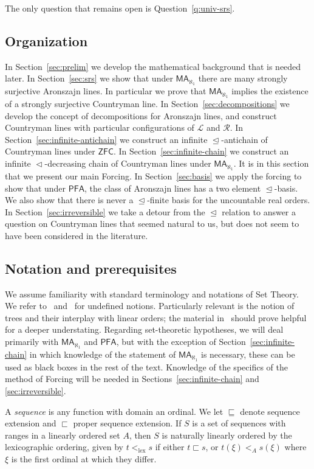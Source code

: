 \documentclass[10pt]{amsart}
\theoremstyle{definition}
\theoremstyle{remark}
\newcommand{\axiom}[1]{\mathsf{#1}}
\newcommand{\ZFC}{\axiom{ZFC}}
\newcommand{\MA}{\axiom{MA}}
\newcommand{\PFA}{\axiom{PFA}}
\newcommand{\sle}{\vartriangleleft}
\newcommand{\sleq}{\trianglelefteq}
\renewcommand{\L}{\mathscr{L}}
\newcommand{\R}{\mathscr{R}}
\newcommand\lex{\mathrm{lex}}
\newcommand{\1}{\mathbbm{1}}
\newcommand{\tleq}{\sqsubseteq}
\newcommand{\tle}{\sqsubset}
\begin{document}
The only question that remains open is Question~\ref{q:univ-srs}.

\subsection*{Organization}
In Section~\ref{sec:prelim} we develop the mathematical background that is
needed later.
In Section~\ref{sec:srs} we show that under
$\MA_{\aleph_{1}}$ there are many strongly surjective Aronszajn lines.
In particular we prove that $\MA_{\aleph_{1}}$ implies the existence
of a strongly surjective Countryman line.
In Section~\ref{sec:decompositions}
we develop the concept of decompositions for Aronszajn lines, and
construct Countryman lines with particular configurations of $\L$ and
$\R$.
In Section~\ref{sec:infinite-antichain} we construct an infinite
$\sleq$-antichain of Countryman lines under $\ZFC$.
In Section~\ref{sec:infinite-chain} we construct an infinite
$\sle$-decreasing chain of Countryman lines under $\MA_{\aleph_{1}}$. It is
in this section that we present our main Forcing.
In Section~\ref{sec:basis} we apply the forcing to show that
under $\PFA$, the class of Aronszajn lines has a two element $\sleq$-basis.
We also show that there is never a $\sleq$-finite basis for the uncountable real
orders.
In Section~\ref{sec:irreversible} we take a detour from the $\sleq$ relation
to answer a question on Countryman lines that seemed natural to us,
but does not seem to have been considered in the literature.


\subsection*{Notation and prerequisites}

We assume familiarity with standard terminology and notations of Set
Theory. We refer to~\cite{Jech2003} and~\cite{Kunen1980} for undefined
notions. Particularly relevant is the notion of trees and their interplay with
linear orders; the material in~\cite{Todorcevic1984} should prove
helpful for a deeper understating.
Regarding set-theoretic hypotheses, we will deal primarily
with $\MA_{\aleph_{1}}$ and $\PFA$, but with the exception
of Section~\ref{sec:infinite-chain} in which knowledge of the
statement of $\MA_{\aleph_{1}}$ is necessary, these can be used
as black boxes in the rest of the text. Knowledge of the
specifics of the method of Forcing will be needed
in Sections~\ref{sec:infinite-chain} and \ref{sec:irreversible}.

A \emph{sequence} is any function with domain an ordinal. We let
$\tleq$ denote sequence extension and $\tle$ proper sequence extension.
If $S$ is
a set of sequences with ranges in a linearly ordered set $A$, then
$S$ is naturally linearly ordered by the lexicographic ordering, given by
$t <_{\lex} s$ if either $t \tle s$, or $t(\xi) <_{A} s(\xi)$
where $\xi$ is the first ordinal at which they differ.
\end{document}
